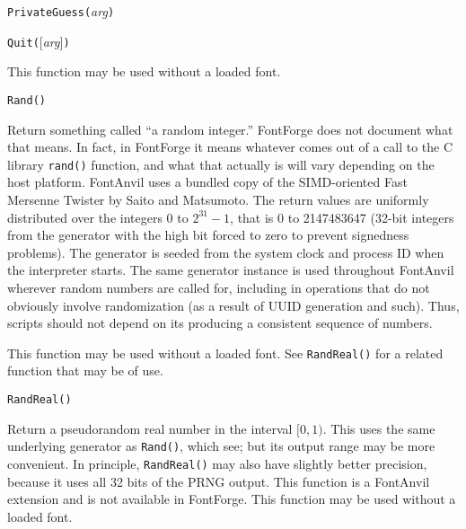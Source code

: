 
\texttt{PrivateGuess(}\textit{arg}\texttt{)}



\texttt{Quit(}[\textit{arg}]\texttt{)}

This function may be used without a loaded font.



\texttt{Rand()}

Return something called ``a random integer.''  FontForge \FFdiff does not
document what that means.  In fact, in FontForge it means whatever comes out
of a call to the C library \texttt{rand()} function, and what that actually
is will vary depending on the host platform.  FontAnvil uses a bundled copy
of the SIMD-oriented Fast Mersenne Twister by Saito and Matsumoto.  The
return values are uniformly distributed over the integers 0 to $2^{31}-1$,
that is 0 to 2147483647 (32-bit integers from the generator with the high
bit forced to zero to prevent signedness problems).  The generator is seeded
from the system clock and process ID when the interpreter starts.  The same
generator instance is used throughout FontAnvil wherever random numbers are
called for, including in operations that do not obviously involve
randomization (as a result of UUID generation and such).  Thus, scripts
should not depend on its producing a consistent sequence of numbers.

This function may be used without a loaded font.  See \texttt{RandReal()}
for a related function that may be of use.



\texttt{RandReal()}

Return a pseudorandom real number in the interval $[0,1)$.  This uses the
same underlying generator as \texttt{Rand()}, which see; but its output
range may be more convenient.  In principle, \texttt{RandReal()} may also
have slightly better precision, because it uses all 32 bits of the PRNG
output.  This \FFdiff function is a FontAnvil extension and is not available
in FontForge.  This function may be used without a loaded font.



